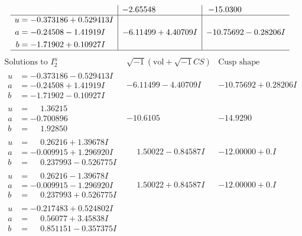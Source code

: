 \documentclass[1p]{elsarticle_modified}
\theoremstyle{definition}
\newcommand{\I}{\sqrt{-1}}
\begin{document}
$$\begin{array}{c|c|c}
 & -2.65548\phantom{ +0.000000I} & -15.0300\phantom{ +0.000000I} \\ \hline\begin{aligned}
u &= -0.373186 + 0.529413 I \\
a &= -0.24508 - 1.41919 I \\
b &= -1.71902 + 0.10927 I\end{aligned}
 & -6.11499 + 4.40709 I & -10.75692 - 0.28206 I\\
 \hline 
 \end{array}$$\newpage$$\begin{array}{c|c|c}  
\text{Solutions to }I^u_{2}& \I (\text{vol} + \sqrt{-1}CS) & \text{Cusp shape}\\
 \hline 
\begin{aligned}
u &= -0.373186 - 0.529413 I \\
a &= -0.24508 + 1.41919 I \\
b &= -1.71902 - 0.10927 I\end{aligned}
 & -6.11499 - 4.40709 I & -10.75692 + 0.28206 I \\ \hline\begin{aligned}
u &= \phantom{-}1.36215\phantom{ +0.000000I} \\
a &= -0.700896\phantom{ +0.000000I} \\
b &= \phantom{-}1.92850\phantom{ +0.000000I}\end{aligned}
 & -10.6105\phantom{ +0.000000I} & -14.9290\phantom{ +0.000000I} \\ \hline\begin{aligned}
u &= \phantom{-}0.26216 + 1.39678 I \\
a &= -0.009915 + 1.296920 I \\
b &= \phantom{-}0.237993 - 0.526775 I\end{aligned}
 & \phantom{-}1.50022 - 0.84587 I & -12.00000 + 0. I\phantom{ +0.000000I} \\ \hline\begin{aligned}
u &= \phantom{-}0.26216 - 1.39678 I \\
a &= -0.009915 - 1.296920 I \\
b &= \phantom{-}0.237993 + 0.526775 I\end{aligned}
 & \phantom{-}1.50022 + 0.84587 I & -12.00000 + 0. I\phantom{ +0.000000I} \\ \hline\begin{aligned}
u &= -0.217483 + 0.524802 I \\
a &= \phantom{-}0.56077 + 3.45838 I \\
b &= \phantom{-}0.851151 - 0.357375 I\end{aligned}

\end{array}$$
\end{document}
